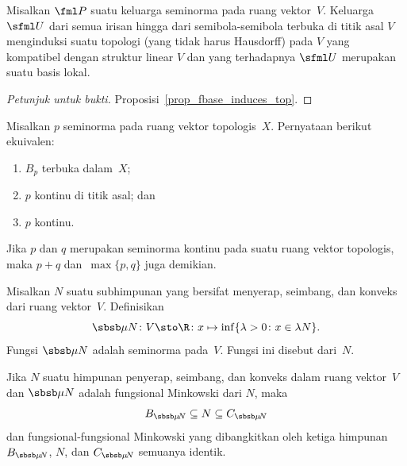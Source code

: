 \begin{prop} Misalkan $\fml P$ suatu keluarga seminorma pada ruang vektor~$V$. Keluarga $\sfml U$ dari semua irisan hingga dari semibola-semibola terbuka
di titik asal $V$ menginduksi suatu topologi (yang tidak harus Hausdorff) pada $V$ yang kompatibel dengan struktur linear $V$ dan yang terhadapnya
$\sfml U$ merupakan suatu basis lokal.
\end{prop}

\begin{proof}[\emph{Petunjuk untuk bukti}] Proposisi~\ref{prop_fbase_induces_top}.  \ns
\end{proof}

\begin{prop} Misalkan $p$ seminorma pada ruang vektor topologis~$X$. Pernyataan berikut ekuivalen:
   \begin{enumerate}[label=\rm{(\alph*)}]
     \item $B_p$ terbuka dalam~$X$;
     \item $p$ kontinu di titik asal; dan
     \item $p$ kontinu.
   \end{enumerate}
\end{prop}

\begin{prop} Jika $p$ dan $q$ merupakan seminorma kontinu pada suatu ruang vektor topologis, maka $p + q$ dan~$\max\{p,q\}$ juga demikian.
\end{prop}

\begin{exam} Misalkan $N$ suatu subhimpunan yang bersifat menyerap, seimbang, dan konveks dari ruang vektor~$V$. Definisikan
   \[ \sbsb \mu N\colon V \sto \R \colon x \mapsto \inf\{\lambda > 0\colon x \in \lambda N\}. \]
Fungsi $\sbsb \mu N$ adalah seminorma pada~$V$. Fungsi ini disebut
 dari~$N$.
\end{exam}

\begin{prop} Jika $N$ suatu himpunan penyerap, seimbang, dan konveks dalam ruang vektor~$V$ dan $\sbsb \mu N$ adalah fungsional Minkowski dari $N$, maka
     \[ B_{\sbsb \mu{\!N}} \subseteq N \subseteq C_{\sbsb \mu{\!N}} \]
dan fungsional-fungsional Minkowski yang dibangkitkan oleh ketiga himpunan $B_{\sbsb \mu{\!N}}$, $N$, dan $C_{\sbsb \mu{\!N}}$ semuanya identik.
\end{prop}

